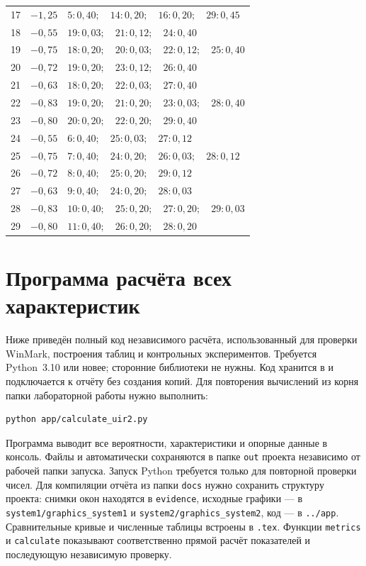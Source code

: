 \documentclass[a4paper,12pt]{article}
\begin{document}
{\begin{longtable}{@{}r r p{12.7cm}@{}}
17 & $-1{,}25$ & $5:0{,}40;\quad 14:0{,}20;\quad 16:0{,}20;\quad 29:0{,}45$ \\
18 & $-0{,}55$ & $19:0{,}03;\quad 21:0{,}12;\quad 24:0{,}40$ \\
19 & $-0{,}75$ & $18:0{,}20;\quad 20:0{,}03;\quad 22:0{,}12;\quad 25:0{,}40$ \\
20 & $-0{,}72$ & $19:0{,}20;\quad 23:0{,}12;\quad 26:0{,}40$ \\
21 & $-0{,}63$ & $18:0{,}20;\quad 22:0{,}03;\quad 27:0{,}40$ \\
22 & $-0{,}83$ & $19:0{,}20;\quad 21:0{,}20;\quad 23:0{,}03;\quad 28:0{,}40$ \\
23 & $-0{,}80$ & $20:0{,}20;\quad 22:0{,}20;\quad 29:0{,}40$ \\
24 & $-0{,}55$ & $6:0{,}40;\quad 25:0{,}03;\quad 27:0{,}12$ \\
25 & $-0{,}75$ & $7:0{,}40;\quad 24:0{,}20;\quad 26:0{,}03;\quad 28:0{,}12$ \\
26 & $-0{,}72$ & $8:0{,}40;\quad 25:0{,}20;\quad 29:0{,}12$ \\
27 & $-0{,}63$ & $9:0{,}40;\quad 24:0{,}20;\quad 28:0{,}03$ \\
28 & $-0{,}83$ & $10:0{,}40;\quad 25:0{,}20;\quad 27:0{,}20;\quad 29:0{,}03$ \\
29 & $-0{,}80$ & $11:0{,}40;\quad 26:0{,}20;\quad 28:0{,}20$ \\
\end{longtable}}

\clearpage
\section{Программа расчёта всех характеристик}\label{app:code}
Ниже приведён полный код независимого расчёта, использованный для проверки WinMark, построения таблиц и контрольных экспериментов. Требуется Python~3.10 или новее; сторонние библиотеки не нужны. Код хранится в  и подключается к отчёту без создания копий. Для повторения вычислений из корня папки лабораторной работы нужно выполнить:
\begin{lstlisting}[language=bash,numbers=none]
python app/calculate_uir2.py
\end{lstlisting}
Программа выводит все вероятности, характеристики и опорные данные в консоль. Файлы  и  автоматически сохраняются в папке \texttt{out} проекта независимо от рабочей папки запуска. Запуск Python требуется только для повторной проверки чисел. Для компиляции отчёта из папки \texttt{docs} нужно сохранить структуру проекта: снимки окон находятся в \texttt{evidence}, исходные графики --- в \texttt{system1/graphics\_system1} и \texttt{system2/graphics\_system2}, код --- в \texttt{../app}. Сравнительные кривые и численные таблицы встроены в \texttt{.tex}. Функции \texttt{metrics} и \texttt{calculate} показывают соответственно прямой расчёт показателей и последующую независимую проверку.
\end{document}
